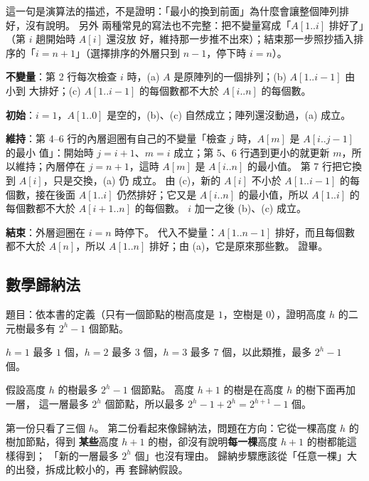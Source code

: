 這一句是演算法的描述，不是證明：「最小的換到前面」為什麼會讓整個陣列排好，沒有說明。 另外
兩種常見的寫法也不完整：把不變量寫成「$A[1..i]$ 排好了」（第 $i$ 趟開始時 $A[i]$ 還沒放
好，維持那一步推不出來）；結束那一步照抄插入排序的「$i = n + 1$」（選擇排序的外層只到
$n - 1$，停下時 $i = n$）。

\begin{exmgood}
\textbf{不變量}：第 2 行每次檢查 $i$ 時，(a) $A$ 是原陣列的一個排列；(b) $A[1..i-1]$ 由小到
大排好；(c) $A[1..i-1]$ 的每個數都不大於 $A[i..n]$ 的每個數。

\textbf{初始}：$i = 1$，$A[1..0]$ 是空的，(b)、(c) 自然成立；陣列還沒動過，(a) 成立。

\textbf{維持}：第 4--6 行的內層迴圈有自己的不變量「檢查 $j$ 時，$A[m]$ 是 $A[i..j-1]$ 的最小
值」：開始時 $j = i + 1$、$m = i$ 成立；第 5、6 行遇到更小的就更新 $m$，所以維持；內層停在
$j = n + 1$，這時 $A[m]$ 是 $A[i..n]$ 的最小值。 第 7 行把它換到 $A[i]$，只是交換，(a) 仍
成立。 由 (c)，新的 $A[i]$ 不小於 $A[1..i-1]$ 的每個數，接在後面 $A[1..i]$ 仍然排好；它又是
$A[i..n]$ 的最小值，所以 $A[1..i]$ 的每個數都不大於 $A[i+1..n]$ 的每個數。 $i$ 加一之後
(b)、(c) 成立。

\textbf{結束}：外層迴圈在 $i = n$ 時停下。 代入不變量：$A[1..n-1]$ 排好，而且每個數都不大於
$A[n]$，所以 $A[1..n]$ 排好；由 (a)，它是原來那些數。 證畢。
\end{exmgood}

\subsection{數學歸納法}

題目：依本書的定義（只有一個節點的樹高度是 $1$，空樹是 $0$），證明高度 $h$ 的二元樹最多有
$2^h - 1$ 個節點。

\begin{exmbad}[只驗證幾個例子]
$h = 1$ 最多 $1$ 個，$h = 2$ 最多 $3$ 個，$h = 3$ 最多 $7$ 個，以此類推，最多 $2^h - 1$ 個。
\end{exmbad}

\begin{exmbad}[從小樹「長出」大樹]
假設高度 $h$ 的樹最多 $2^h - 1$ 個節點。 高度 $h + 1$ 的樹是在高度 $h$ 的樹下面再加一層，
這一層最多 $2^h$ 個節點，所以最多 $2^h - 1 + 2^h = 2^{h+1} - 1$ 個。
\end{exmbad}

第一份只看了三個 $h$。 第二份看起來像歸納法，問題在方向：它從一棵高度 $h$ 的樹加節點，得到
\textbf{某些}高度 $h + 1$ 的樹，卻沒有說明\textbf{每一棵}高度 $h + 1$ 的樹都能這樣得到；
「新的一層最多 $2^h$ 個」也沒有理由。 歸納步驟應該從「任意一棵」大的出發，拆成比較小的，再
套歸納假設。

